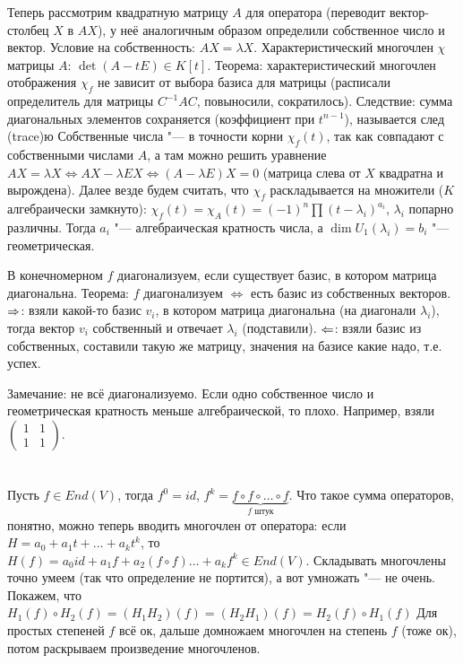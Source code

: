 Теперь рассмотрим квадратную матрицу $A$ для оператора (переводит вектор-столбец $X$ в $AX$), у неё аналогичным образом определили собственное число и вектор.
Условие на собственность: $AX=\lambda X$.
Характеристический многочлен $\chi$ матрицы $A$: $\det (A - tE) \in K[t]$.
Теорема: характеристический многочлен отображения $\chi_f$ не зависит от выбора базиса для матрицы (расписали определитель для матрицы $C^{-1}AC$, повыносили, сократилось).
Следствие: сумма диагональных элементов сохраняется (коэффициент при $t^{n-1}$), называется след (trace)ю
Собственные числа "--- в точности корни $\chi_f(t)$, так как совпадают с собственными числами $A$, а там можно решить уравнение $AX =\lambda X \iff AX-\lambda EX \iff (A-\lambda E)X = 0$
(матрица слева от $X$ квадратна и вырождена).
Далее везде будем считать, что $\chi_f$ раскладывается на множители ($K$ алгебраически замкнуто):
$\chi_f(t) = \chi_A(t) = (-1)^n \prod (t - \lambda_i)^{a_i}$, $\lambda_i$ попарно различны.
Тогда $a_i$ "--- алгебраическая кратность числа, а $\dim U_1(\lambda_i) = b_i$ "--- геометрическая.

В конечномерном $f$ диагонализуем, если существует базис, в котором матрица диагональна.
Теорема: $f$ диагонализуем $\iff$ есть базис из собственных векторов.
$\Rightarrow$: взяли какой-то базис $v_i$, в котором матрица диагональна (на диагонали $\lambda_i$), тогда вектор $v_i$ собственный и отвечает $\lambda_i$ (подставили).
$\Leftarrow$: взяли базис из собственных, составили такую же матрицу, значения на базисе какие надо, т.е. успех.

Замечание: не всё диагонализуемо.
Если одно собственное число и геометрическая кратность меньше алгебраической, то плохо.
Например, взяли $\begin{pmatrix}1&1\\1&1\end{pmatrix}$.

\section{} %
Пусть $f \in End(V)$, тогда $f^0 = id$, $f^k = \underbrace{f \circ f \circ \dots \circ f}_{f\text{~штук}}$.
Что такое сумма операторов, понятно, можно теперь вводить многочлен от оператора:
если $H=a_0+a_1t + \dots + a_kt^k$, то $H(f)=a_0 id + a_1 f + a_2 (f\circ f) \dots + a_k f^k \in End(V)$.
Складывать многочлены точно умеем (так что определение не портится), а вот умножать "--- не очень.
Покажем, что $H_1(f) \circ H_2(f) = (H_1H_2)(f) = (H_2H_1)(f) = H_2(f) \circ H_1(f)$
Для простых степеней $f$ всё ок, дальше домножаем многочлен на степень $f$ (тоже ок), потом раскрываем произведение многочленов.

